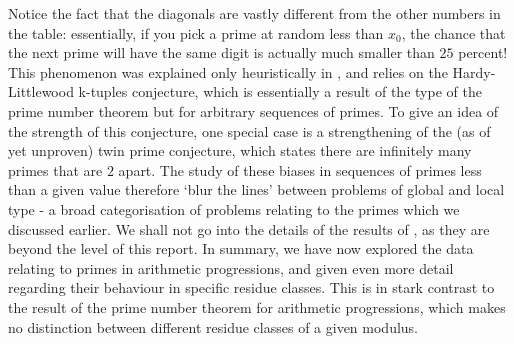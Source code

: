 Notice the fact that the diagonals are vastly different from the other numbers in the table: essentially, if you pick a prime at random less than $x_0$, the chance that the next prime will have the same digit is actually much smaller than $25$ percent! This phenomenon was explained only heuristically in \cite{LemkeOliverE4446}, and relies on the Hardy-Littlewood k-tuples conjecture, which is essentially a result of the type of the prime number theorem but for arbitrary sequences of primes. To give an idea of the strength of this conjecture, one special case is a strengthening of the (as of yet unproven) twin prime conjecture, which states there are infinitely many primes that are $2$ apart. The study of these biases in sequences of primes less than a given value therefore `blur the lines' between problems of global and local type - a broad categorisation of problems relating to the primes which we discussed earlier. We shall not go into the details of the results of \cite{LemkeOliverE4446}, as they are beyond the level of this report. In summary, we have now explored the data relating to primes in arithmetic progressions, and given even more detail regarding their behaviour in specific residue classes. This is in stark contrast to the result of the prime number theorem for arithmetic progressions, which makes no distinction between different residue classes of a given modulus. 